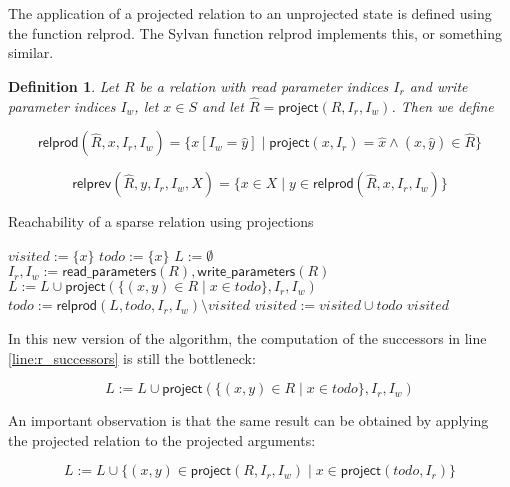 \documentclass{article}
\newtheorem{definition}[theorem]{Definition}
\newcommand{\var}[1]{\ensuremath{\textit{#1}}}
\begin{document}
\noindent
The application of a projected relation to an unprojected state is defined using the function \textsf{relprod}. The Sylvan function \textsf{relprod} implements this, or something similar.

\begin{definition}
Let $R$ be a relation with read parameter indices $I_r$ and write parameter indices $I_w$, let $x \in S$ and let
 $\hat{R} = \textsf{project}(R, I_r, I_w)$. Then we define

\[
    \textsf{relprod}(\hat{R}, x, I_r, I_w) =
        \{ 
          x[I_w = \hat{y}] \mid \textsf{project}(x, I_r) = \hat{x} \land 
          (\hat{x}, \hat{y}) \in \hat{R}
        \}
\]

\[
    \textsf{relprev}(\hat{R}, y, I_r, I_w, X) =
        \{ 
           x \in X \mid y \in \textsf{relprod}(\hat{R}, x, I_r, I_w)
        \}
\]
\end{definition}

\begin{algorithm}[h]
\caption{Reachability of a sparse relation using projections}
\label{alg:reachability3}
\begin{algorithmic}[1]
\State $\var{visited} := \{ x \}$
\State $\var{todo} := \{ x \}$
\State $L := \emptyset$ 
\State $I_r, I_w := \textsf{read\_parameters}(R), \textsf{write\_parameters}(R)$
\While {$\var{todo} \neq \emptyset$}
    \State $L := L \cup \textsf{project}(\{ (x,y) \in R \mid x \in \var{todo} \}, I_r, I_w) $  \label{line:r_successors}
    \State $\var{todo} := \textsf{relprod}(L, \var{todo}, I_r, I_w) \setminus \var{visited}$ 
    \State $\var{visited} := \var{visited} \cup \var{todo}$
\EndWhile
\State \Return \var{visited}
\EndFunction
\end{algorithmic}
\end{algorithm}

\noindent
In this new version of the algorithm, the computation of the successors in line \ref{line:r_successors} is still the bottleneck:

\[
L := L \cup \textsf{project}(\{ (x,y) \in R \mid x \in \var{todo} \}, I_r, I_w)
\]

\noindent
An important observation is that the same result can be obtained by applying the projected relation to the projected arguments:

\[
L := L \cup \{ (x,y) \in \textsf{project}(R, I_r, I_w) \mid x \in \textsf{project}(\var{todo}, I_r) \}
\]
\end{document}
